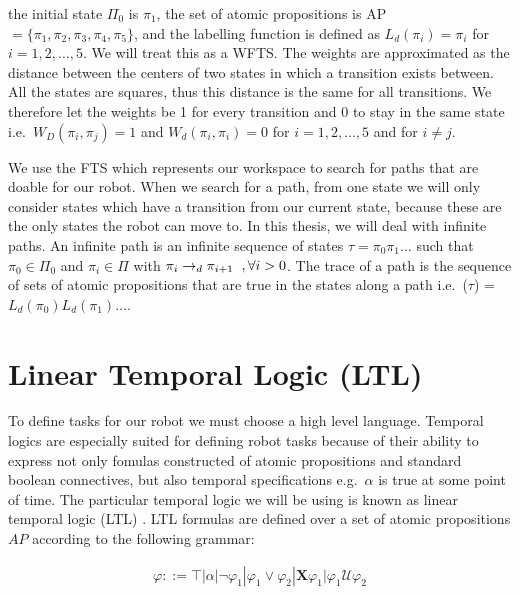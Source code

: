 the initial state $\Pi_0$ is $\pi_1$, the set of atomic propositions is AP$=\{\pi_1,\pi_2,\pi_3,\pi_4,\pi_5\}$, and the labelling function is defined as $L_d(\pi_i) = \pi_i$ for $i=1,2,\dots,5$. We will treat this as a WFTS. The weights are approximated as the distance between the centers of two states in which a transition exists between. All the states are squares, thus this distance is the same for all transitions. We therefore let the weights be 1 for every transition and 0 to stay in the same state i.e.\ $W_D(\pi_i, \pi_j) = 1$ and $W_d(\pi_i,\pi_i)=0$ for $i=1,2,\dots,5$ and for $i \neq j$.


We use the FTS which represents our workspace to search for paths that are doable for our robot. When we search for a path, from one state we will only consider states which have a transition from our current state, because these are the only states the robot can move to.  In this thesis, we will deal with infinite paths. An infinite path is an infinite sequence of states $\tau = \pi_0 \pi_1 \dots$ such that $\pi_0 \in \Pi_0$ and $\pi_i \in \Pi$ with $\pi_{i} \rightarrow_d \pi_{i+1} \hspace{0.2cm}, \forall i > 0$. The trace of a path is the sequence of sets of atomic propositions that are true in the states along a path i.e.\ \trace($\tau$) = $L_d(\pi_0) L_d(\pi_1) \dots$.   %


\section{Linear Temporal Logic (LTL)}
To define tasks for our robot we must choose a high level language. Temporal logics are especially suited for defining robot tasks because of their ability to express not only fomulas constructed of atomic propositions and standard boolean connectives, but also temporal specifications e.g.\ $\alpha$ is true at some point of time. The particular temporal logic we will be using is known as linear temporal logic (LTL) \cite{clarke99}. LTL formulas are defined over a set of atomic propositions $AP$ according to the following grammar: %

\begin{align*}
    \varphi ::= \top | \alpha | \neg \varphi_1 | \varphi_1  \lor \varphi_2 | \textbf{X} \varphi_1 | \varphi_1 \bm{\mathcal{U}} \varphi_2
\end{align*}

